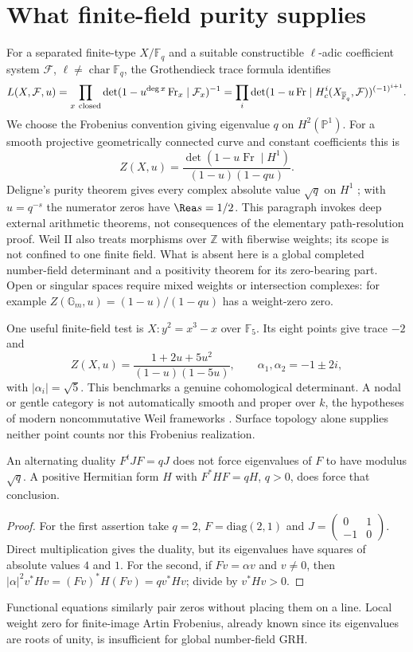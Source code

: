 \section{What finite-field purity supplies}
For a separated finite-type $X/\mathbb F_q$ and a suitable constructible $\ell$-adic coefficient system $\mathcal F$, $\ell\ne\operatorname{char}\mathbb F_q$, the Grothendieck trace formula identifies
\[
 L(X,\mathcal F,u)=\prod_{x\ {\rm closed}}
 \det(1-u^{\deg x}\operatorname{Fr}_x\mid\mathcal F_x)^{-1}
 =\prod_i\det(1-u\operatorname{Fr}\mid H_c^i(X_{\overline{\mathbb F}_q},\mathcal F))^{(-1)^{i+1}}.
\]
We choose the Frobenius convention giving eigenvalue $q$ on $H^2(\mathbb P^1)$. For a smooth projective geometrically connected curve and constant coefficients this is
\[
 Z(X,u)=\frac{\det(1-u\operatorname{Fr}\mid H^1)}{(1-u)(1-qu)}.
\]
Deligne's purity theorem gives every complex absolute value $\sqrt q$ on $H^1$ \cite{WeilI,WeilII}; with $u=q^{-s}$ the numerator zeros have $\Rea s=1/2$. This paragraph invokes deep external arithmetic theorems, not consequences of the elementary path-resolution proof. Weil II also treats morphisms over $\mathbb Z$ with fiberwise weights; its scope is not confined to one finite field. What is absent here is a global completed number-field determinant and a positivity theorem for its zero-bearing part. Open or singular spaces require mixed weights or intersection complexes: for example $Z(\mathbb G_m,u)=(1-u)/(1-qu)$ has a weight-zero zero.

One useful finite-field test is $X:y^2=x^3-x$ over $\mathbb F_5$. Its eight points give trace $-2$ and
\[
 Z(X,u)=\frac{1+2u+5u^2}{(1-u)(1-5u)},\qquad
 \alpha_1,\alpha_2=-1\pm2i,
\]
with $|\alpha_i|=\sqrt5$. This benchmarks a genuine cohomological determinant. A nodal or gentle category is not automatically smooth and proper over $k$, the hypotheses of modern noncommutative Weil frameworks \cite{Tabuada}. Surface topology alone supplies neither point counts nor this Frobenius realization.

\begin{proposition}\label{prop:purity}
An alternating duality $F^tJF=qJ$ does not force eigenvalues of $F$ to have modulus $\sqrt q$. A positive Hermitian form $H$ with $F^*HF=qH$, $q>0$, does force that conclusion.
\end{proposition}
\begin{proof}
For the first assertion take $q=2$, $F=\mathrm{diag}(2,1)$ and $J=\left(\begin{smallmatrix}0&1\\-1&0\end{smallmatrix}\right)$. Direct multiplication gives the duality, but its eigenvalues have squares of absolute values $4$ and $1$. For the second, if $Fv=\alpha v$ and $v\ne0$, then
$|\alpha|^2v^*Hv=(Fv)^*H(Fv)=qv^*Hv$; divide by $v^*Hv>0$.
\end{proof}
Functional equations similarly pair zeros without placing them on a line. Local weight zero for finite-image Artin Frobenius, already known since its eigenvalues are roots of unity, is insufficient for global number-field GRH.

